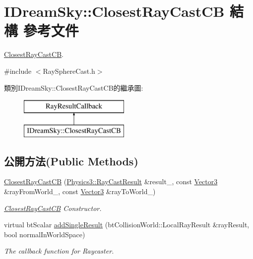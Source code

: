 \hypertarget{struct_i_dream_sky_1_1_closest_ray_cast_c_b}{}\section{I\+Dream\+Sky\+:\+:Closest\+Ray\+Cast\+CB 結構 參考文件}
\label{struct_i_dream_sky_1_1_closest_ray_cast_c_b}


\hyperlink{struct_i_dream_sky_1_1_closest_ray_cast_c_b}{Closest\+Ray\+Cast\+CB}.  




{\ttfamily \#include $<$Ray\+Sphere\+Cast.\+h$>$}

類別\+I\+Dream\+Sky\+:\+:Closest\+Ray\+Cast\+C\+B的繼承圖\+:\begin{figure}[H]
\begin{center}
\leavevmode
\includegraphics[height=2.000000cm]{struct_i_dream_sky_1_1_closest_ray_cast_c_b}
\end{center}
\end{figure}
\subsection*{公開方法(Public Methods)}
\begin{DoxyCompactItemize}
\item 
\hyperlink{struct_i_dream_sky_1_1_closest_ray_cast_c_b_a7f52381289633a13aa87bfbb81d3dda1}{Closest\+Ray\+Cast\+CB} (\hyperlink{class_i_dream_sky_1_1_physics3_1_1_ray_cast_result}{Physics3\+::\+Ray\+Cast\+Result} \&result\+\_\+, const \hyperlink{class_i_dream_sky_1_1_vector3}{Vector3} \&ray\+From\+World\+\_\+, const \hyperlink{class_i_dream_sky_1_1_vector3}{Vector3} \&ray\+To\+World\+\_\+)
\begin{DoxyCompactList}\small\item\em \hyperlink{struct_i_dream_sky_1_1_closest_ray_cast_c_b}{Closest\+Ray\+Cast\+CB} Constructor. \end{DoxyCompactList}\item 
virtual bt\+Scalar \hyperlink{struct_i_dream_sky_1_1_closest_ray_cast_c_b_aaabb74387550ffe1066afe423f91b786}{add\+Single\+Result} (bt\+Collision\+World\+::\+Local\+Ray\+Result \&ray\+Result, bool normal\+In\+World\+Space)
\begin{DoxyCompactList}\small\item\em The callback function for Raycaster. \end{DoxyCompactList}\end{DoxyCompactItemize}
